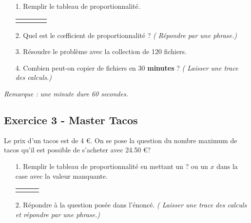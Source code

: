 \documentclass[12pt]{article}
\begin{document}
\begin{enumerate}
\item[1.] Remplir le tableau de proportionnalité.
  \begin{center}
    \begin{tabular}{| c || c | c | c |}
      \hline
      \phantom{$\frac{aze}{aazertyuiop}$ \phantom{azertyuiop}} & \phantom{$\frac{aze}{aazertyuiop}$} & \phantom{$\frac{aze}{aazertyuiop}$}  & \phantom{$\frac{aze}{aazertyuiop}$}\\
      \hline
       & & & \\ 
      \hline
    \end{tabular}
  \end{center}
\item[2.] Quel est le cœfficient de proportionnalité ? \textit{( Répondre par une phrase.)}
\vspace{1cm}

\item[3.] Résoudre le problème avec la collection de 120 fichiers. 
  \vspace{1cm}
\item[4.] Combien peut-on copier de fichiers en 30 \textbf{minutes} ? \textit{( Laisser une trace des calculs.)} 
  \vspace{2cm}
\end{enumerate}
\textit{Remarque : une minute dure 60 secondes.}

\subsection*{Exercice 3 - Master Tacos}

Le prix d'un tacos est de 4 \euro{}. On se pose la question du nombre maximum de tacos qu'il est possible de s'acheter avec 24.50 \euro{}?

\begin{enumerate}
\item[1.] Remplir le tableau de proportionnalité en mettant un ? ou un $x$ dans la case avec la valeur manquante.

  \begin{center}
    \begin{tabular}{| c || c | c |}
      \hline
      \phantom{$\frac{aze}{aazertyuiop azertyuiop}$} & \phantom{$\frac{aze}{aazertyuiop}$} & \phantom{$\frac{aze}{aazertyuiop}$} \\
      \hline
      \phantom{$\frac{aze}{aazertyuiop azertyuiop}$} & \phantom{$\frac{aze}{aazertyuiop}$} & \phantom{$\frac{aze}{aazertyuiop}$} \\ 
      \hline
    \end{tabular}
  \end{center}

\item[2.] Répondre à la question posée dans l'énoncé. \textit{( Laisser une trace des calculs et répondre par une phrase.)}
  \vspace{2cm}

\end{enumerate}
\end{document}
